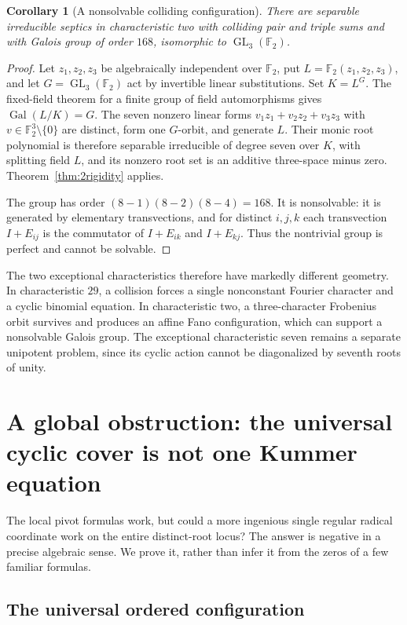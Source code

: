 \documentclass[11pt,a4paper]{article}
\newtheorem{corollary}[theorem]{Corollary}
\theoremstyle{definition}
\theoremstyle{remark}
\newcommand{\F}{\mathbb F}
\newcommand{\Gal}{\operatorname{Gal}}
\begin{document}
\begin{corollary}[A nonsolvable colliding configuration]
There are separable irreducible septics in characteristic two with
colliding pair and triple sums and with Galois group of order $168$,
isomorphic to $\operatorname{GL}_3(\F_2)$.
\end{corollary}
\begin{proof}
Let $z_1,z_2,z_3$ be algebraically independent over $\F_2$, put
$L=\F_2(z_1,z_2,z_3)$, and let $G=\operatorname{GL}_3(\F_2)$ act by
invertible linear substitutions. Set $K=L^G$. The fixed-field theorem
for a finite group of field automorphisms gives
$\Gal(L/K)=G$. The seven nonzero linear forms
$v_1z_1+v_2z_2+v_3z_3$ with $v\in\F_2^3\setminus\{0\}$ are distinct,
form one $G$-orbit, and generate $L$. Their monic root polynomial is
therefore separable irreducible of degree seven over $K$, with splitting
field $L$, and its nonzero root set is an additive three-space minus zero.
Theorem~\ref{thm:2rigidity} applies.

The group has order $(8-1)(8-2)(8-4)=168$. It is nonsolvable: it is
generated by elementary transvections, and for distinct $i,j,k$ each
transvection $I+E_{ij}$ is the commutator of $I+E_{ik}$ and $I+E_{kj}$.
Thus the nontrivial group is perfect and cannot be solvable.
\end{proof}

The two exceptional characteristics therefore have markedly different
geometry. In characteristic $29$, a collision forces a single
nonconstant Fourier character and a cyclic binomial equation. In
characteristic two, a three-character Frobenius orbit survives and produces
an affine Fano configuration, which can support a nonsolvable Galois group.
The exceptional characteristic seven remains a separate unipotent problem,
since its cyclic action cannot be diagonalized by seventh roots of unity.

\section{A global obstruction: the universal cyclic cover is not one Kummer equation}
\label{sec:global}

The local pivot formulas work, but could a more ingenious single regular
radical coordinate work on the entire distinct-root locus? The answer is
negative in a precise algebraic sense. We prove it, rather than infer it
from the zeros of a few familiar formulas.

\subsection{The universal ordered configuration}
\end{document}
